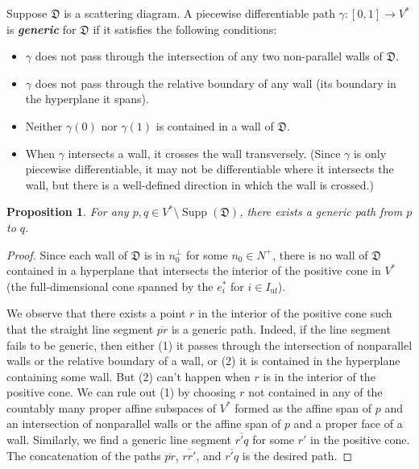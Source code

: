 \documentclass{amsart}
\newtheorem{prop}[proposition]{Proposition}
\theoremstyle{definition}
\theoremstyle{remark}
\numberwithin{equation}{section}
\newcommand{\newword}[1]{\textbf{\emph{#1}}}
\newcommand{\uf}{{\operatorname{uf}}}
\newcommand{\D}{{\mathfrak D}}
\newcommand{\0}{{\mathbf{0}}}
\newcommand{\Supp}{\operatorname{Supp}}
\newcommand{\seg}[1]{\overline{#1}}
\begin{document}
Suppose $\D$ is a scattering diagram.
A piecewise differentiable path $\gamma:[0,1]\to V^*$ is \newword{generic} for $\D$ if it satisfies the following conditions:
\begin{itemize}
\item $\gamma$ does not pass through the intersection of any two non-parallel walls of $\D$.
\item $\gamma$ does not pass through the relative boundary of any wall (its boundary in the hyperplane it spans).
\item Neither $\gamma(0)$ nor $\gamma(1)$ is contained in a wall of $\D$.
\item When $\gamma$ intersects a wall, it crosses the wall transversely.  (Since $\gamma$ is only piecewise differentiable, it may not be differentiable where it intersects the wall, but there is a well-defined direction in which the wall is crossed.)
\end{itemize}

\begin{prop}\label{generic exists}
For any $p,q\in V^*\setminus\Supp(\D)$, there exists a generic path from $p$ to $q$.
\end{prop}
\begin{proof}
Since each wall of $\D$ is in $n_0^\perp$ for some $n_0\in N^+$, there is no wall of $\D$ contained in a hyperplane that intersects the interior of the positive cone in $V^*$ (the full-dimensional cone spanned by the $e^*_i$ for $i\in I_\uf$).

We observe that there exists a point $r$ in the interior of the positive cone such that the straight line segment $\seg{pr}$ is a generic path.
Indeed, if the line segment fails to be generic, then either (1) it passes through the intersection of nonparallel walls or the relative boundary of a wall, or (2) it is contained in the hyperplane containing some wall.
But (2) can't happen when $r$ is in the interior of the positive cone.
We can rule out (1) by choosing $r$ not contained in any of the countably many proper affine subspaces of $V^*$ formed as the affine span of $p$ and an intersection of nonparallel walls or the affine span of $p$ and a proper face of a wall.
Similarly, we find a generic line segment $\seg{r'q}$ for some $r'$ in the positive cone.
The concatenation of the paths $\seg{pr}$, $\seg{rr'}$, and $\seg{r'q}$ is the desired path.
\end{proof}
\end{document}
